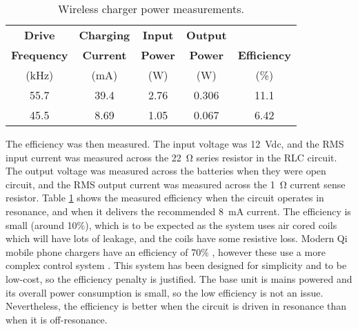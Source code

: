 \begin{table}[htb]
	\begin{center}
	\caption{Wireless charger power measurements.}
	\label{tab: efficiency}
	\begin{tabular}{|c|c|c|c|c|}
	\hline
	\textbf{Drive} & \textbf{Charging} & \textbf{Input} & \textbf{Output} & \\
	\textbf{Frequency} & \textbf{Current} & \textbf{Power} & \textbf{Power} & \textbf{Efficiency} \\
	(\si{\kilo\hertz}) & (\si{\milli\ampere}) & (\si{\watt}) & (\si{\watt}) & (\%)\\
	\hline
	55.7 & 39.4 & 2.76 & 0.306 & 11.1\\
	\hline
	45.5 & 8.69 & 1.05 & 0.067 & 6.42\\
	\hline	
	\end{tabular}
	\end{center}
\end{table}

The efficiency was then measured. The input voltage was \SI{12}{\volt}dc, and the RMS input current was measured across the \SI{22}{\ohm} series resistor in the RLC circuit. The output voltage was measured across the batteries when they were open circuit, and the RMS output current was measured across the \SI{1}{\ohm} current sense resistor. Table \ref{tab: efficiency} shows the measured efficiency when the circuit operates in resonance, and when it delivers the recommended \SI{8}{\milli\ampere} current. The efficiency is small (around 10\%), which is to be expected as the system uses air cored coils which will have lots of leakage, and the coils have some resistive loss. Modern Qi mobile phone chargers have an efficiency of 70\% \cite{wireless_power_review}, however these use a more complex control system \cite{wireless_power_review}. This system has been designed for simplicity and to be low-cost, so the efficiency penalty is justified. The base unit is mains powered and its overall power consumption is small, so the low efficiency is not an issue. Nevertheless, the efficiency is better when the circuit is driven in resonance than when it is off-resonance.\\ %







